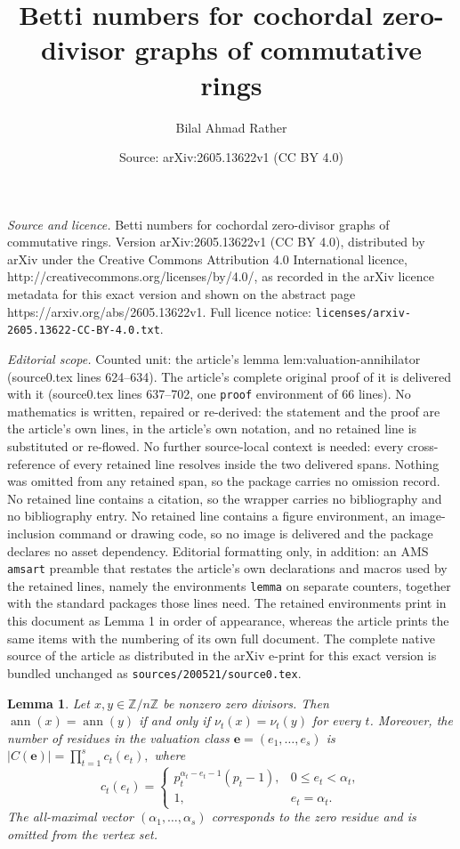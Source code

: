 \documentclass[10pt,a4paper]{amsart}
\title{Betti numbers for cochordal zero-divisor graphs of commutative rings}
\author{Bilal Ahmad Rather}
\date{Source: arXiv:2605.13622v1 (CC BY 4.0)}
\newtheorem{lemma}{Lemma}
\begin{document}
\maketitle

\noindent\emph{Source and licence.} Betti numbers for cochordal zero-divisor graphs of commutative rings. Version arXiv:2605.13622v1 (CC BY 4.0), distributed by arXiv under the Creative Commons Attribution 4.0 International licence, http://creativecommons.org/licenses/by/4.0/, as recorded in the arXiv licence metadata for this exact version and shown on the abstract page https://arxiv.org/abs/2605.13622v1. Full licence notice: \texttt{licenses/arxiv-2605.13622-CC-BY-4.0.txt}.\par\smallskip

\noindent\textit{Editorial scope.} Counted unit: the article's lemma lem:valuation-annihilator (source0.tex lines 624--634). The article's complete original proof of it is delivered with it (source0.tex lines 637--702, one \texttt{proof} environment of 66 lines). No mathematics is written, repaired or re-derived: the statement and the proof are the article's own lines, in the article's own notation, and no retained line is substituted or re-flowed.  No further source-local context is needed: every cross-reference of every retained line resolves inside the two delivered spans.  Nothing was omitted from any retained span, so the package carries no omission record.  No retained line contains a citation, so the wrapper carries no bibliography and no bibliography entry.  No retained line contains a figure environment, an image-inclusion command or drawing code, so no image is delivered and the package declares no asset dependency.  Editorial formatting only, in addition: an AMS \texttt{amsart} preamble that restates the article's own declarations and macros used by the retained lines, namely the environments \texttt{lemma} on separate counters, together with the standard packages those lines need.  The retained environments print in this document as Lemma 1 in order of appearance, whereas the article prints the same items with the numbering of its own full document.  The complete native source of the article as distributed in the arXiv e-print for this exact version is bundled unchanged as \texttt{sources/200521/source0.tex}.
\begin{lemma}\label{lem:valuation-annihilator}
	Let $x,y\in \mathbb{Z}/n\mathbb{Z}$ be nonzero zero divisors.  Then $\operatorname{ann}(x)=\operatorname{ann}(y)$ if and only if $\nu_t(x)=\nu_t(y)$ for every $t$.  Moreover, the number of residues in the valuation class $\mathbf e=(e_1,\ldots,e_s)$ is $|C(\mathbf e)|=\prod_{t=1}^s c_t(e_t),$ where
	$$
	 c_t(e_t)=
	\begin{cases}
		p_t^{\alpha_t-e_t-1}(p_t-1),&0\leq e_t<\alpha_t,\\
		1,&e_t=\alpha_t.
	\end{cases}
	$$
	The all-maximal vector $(\alpha_1,\ldots,\alpha_s)$ corresponds to the zero residue and is omitted from the vertex set.
\end{lemma}
\end{document}
